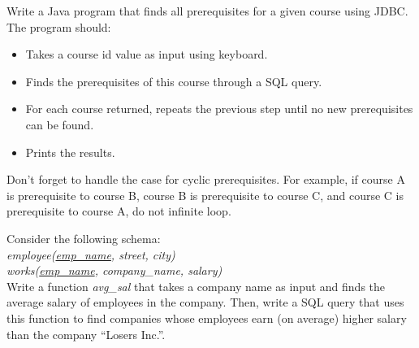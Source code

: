 \documentclass[a4 paper]{article}
\begin{document}
Write a Java program that finds all prerequisites for a given course using JDBC. The program should:
\begin{itemize}
 \item Takes a course id value as input using keyboard.
 \item Finds the prerequisites of this course through a SQL query.
 \item For each course returned, repeats the previous step until no new prerequisites can be found.
 \item Prints the results.
\end{itemize}
Don't forget to handle the case for cyclic prerequisites. For example, if course A is prerequisite to course B, course B is prerequisite to course C, and course C is prerequisite to course A, do not infinite loop.


Consider the following schema:\\
\emph{employee(\underline{emp\_name}, street, city)}\\
\emph{works(\underline{emp\_name}, company\_name, salary)}\\
Write a function \emph{avg\_sal} that takes a company name as input and finds the average salary of employees in the company. Then, write a SQL query that uses this function to find companies whose employees earn (on average) higher salary than the company ``Losers Inc.''.
\end{document}
